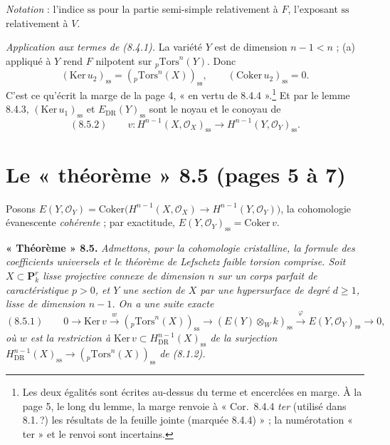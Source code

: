 \documentclass[11pt,a4paper]{article}
\begin{document}
\emph{Notation} : l'indice $\mathrm{ss}$ pour la partie semi-simple
relativement à $F$, l'exposant $\mathrm{ss}$ relativement à $V$.

\emph{Application aux termes de (8.4.1).} La variété $Y$ est de dimension
$n - 1 < n$ ; (a) appliqué à $Y$ rend $F$ nilpotent sur
${}_{p}\mathrm{Tors}^{n}(Y)$. Donc
\[
(\mathrm{Ker}\, u_{2})_{\mathrm{ss}} = ({}_{p}\mathrm{Tors}^{n}(X))_{\mathrm{ss}},
\qquad (\mathrm{Coker}\, u_{2})_{\mathrm{ss}} = 0 .
\]
C'est ce qu'écrit la marge de la page 4, « en vertu de
8.4.4 ».\footnote{Les deux égalités sont écrites au-dessus du terme et
encerclées en marge. À la page 5, le long du lemme, la marge renvoie à « Cor.\
8.4.4 \emph{ter} (utilisé dans 8.1.\,?) les résultats de la feuille jointe
(marquée 8.4.4) » ; la numérotation « ter » et le renvoi sont incertains.}
Et par le lemme 8.4.3, $(\mathrm{Ker}\, u_{1})_{\mathrm{ss}}$ et
$E_{\mathrm{DR}}(Y)_{\mathrm{ss}}$ sont le noyau et le conoyau de
\[
(8.5.2) \qquad v : H^{n-1}(X, \mathcal{O}_{X})_{\mathrm{ss}} \to
H^{n-1}(Y, \mathcal{O}_{Y})_{\mathrm{ss}} .
\]

\section*{Le « théorème » 8.5 (pages 5 à 7)}

Posons $E(Y, \mathcal{O}_{Y}) = \mathrm{Coker}\bigl(H^{n-1}(X,
\mathcal{O}_{X}) \to H^{n-1}(Y, \mathcal{O}_{Y})\bigr)$, la cohomologie
évanescente \emph{cohérente} ; par exactitude,
$E(Y, \mathcal{O}_{Y})_{\mathrm{ss}} = \mathrm{Coker}\, v$.

\textbf{« Théorème » 8.5.} \emph{Admettons, pour la cohomologie cristalline,
la formule des coefficients universels et le théorème de Lefschetz faible
torsion comprise. Soit $X \subset \mathbf{P}^{r}_{k}$ lisse projective connexe
de dimension $n$ sur un corps parfait de caractéristique $p > 0$, et $Y$ une
section de $X$ par une hypersurface de degré $d \geq 1$, lisse de dimension
$n - 1$. On a une suite exacte}
\[
(8.5.1) \qquad 0 \to \mathrm{Ker}\, v \xrightarrow{w}
({}_{p}\mathrm{Tors}^{n}(X))_{\mathrm{ss}} \to
(E(Y) \otimes_{W} k)_{\mathrm{ss}} \xrightarrow{\varphi}
E(Y, \mathcal{O}_{Y})_{\mathrm{ss}} \to 0 ,
\]
\emph{où $w$ est la restriction à $\mathrm{Ker}\, v \subset
H^{n-1}_{\mathrm{DR}}(X)_{\mathrm{ss}}$ de la surjection
$H^{n-1}_{\mathrm{DR}}(X)_{\mathrm{ss}} \to
({}_{p}\mathrm{Tors}^{n}(X))_{\mathrm{ss}}$ de (8.1.2).}
\end{document}
